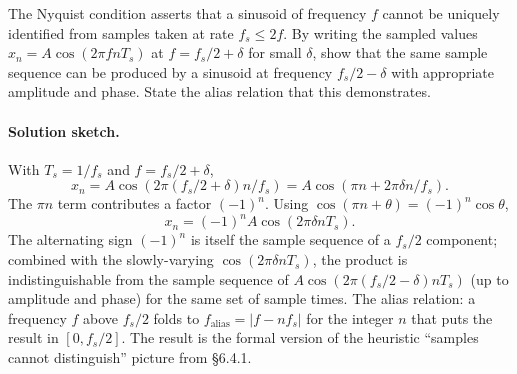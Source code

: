 \begin{exercise}
The Nyquist condition asserts that a sinusoid of frequency $f$
cannot be uniquely identified from samples taken at rate
$f_{s} \leq 2f$. By writing the sampled values
$x_{n} = A \cos(2\pi f n T_{s})$ at $f = f_{s}/2 + \delta$ for
small $\delta$, show that the same sample sequence can be produced
by a sinusoid at frequency $f_{s}/2 - \delta$ with appropriate
amplitude and phase. State the alias relation that this
demonstrates.

\paragraph{Solution sketch.}
With $T_{s} = 1/f_{s}$ and $f = f_{s}/2 + \delta$,
\[
x_{n} = A \cos(2\pi (f_{s}/2 + \delta) n / f_{s})
       = A \cos(\pi n + 2\pi \delta n / f_{s}).
\]
The $\pi n$ term contributes a factor $(-1)^{n}$. Using
$\cos(\pi n + \theta) = (-1)^{n} \cos\theta$,
\[
x_{n} = (-1)^{n} A \cos(2\pi \delta n T_{s}).
\]
The alternating sign $(-1)^{n}$ is itself the sample sequence of a
$f_{s}/2$ component; combined with the slowly-varying
$\cos(2\pi \delta n T_{s})$, the product is indistinguishable from
the sample sequence of $A \cos(2\pi (f_{s}/2 - \delta) n T_{s})$
(up to amplitude and phase) for the same set of sample times. The
alias relation: a frequency $f$ above $f_{s}/2$ folds to
$f_{\text{alias}} = |f - n f_{s}|$ for the integer $n$ that puts
the result in $[0, f_{s}/2]$. The result is the formal version of
the heuristic ``samples cannot distinguish'' picture from
\S 6.4.1.
\end{exercise}

